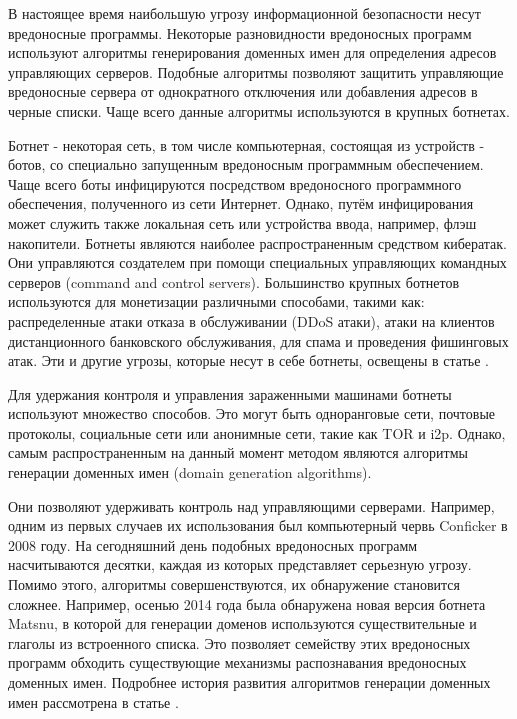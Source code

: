 
В настоящее время наибольшую угрозу информационной безопасности несут вредоносные программы. Некоторые разновидности вредоносных программ используют алгоритмы генерирования доменных имен для определения адресов управляющих серверов. Подобные алгоритмы позволяют защитить управляющие вредоносные сервера от однократного отключения или добавления адресов в черные списки. Чаще всего данные алгоритмы используются в крупных ботнетах.

Ботнет - некоторая сеть, в том числе компьютерная, состоящая из устройств - ботов, со специально запущенным вредоносным программным обеспечением. Чаще всего боты инфицируются посредством вредоносного программного обеспечения, полученного из сети Интернет. Однако, путём инфицирования может служить также локальная сеть или устройства ввода, например, флэш накопители. Ботнеты являются наиболее распространенным средством кибератак. Они управляются создателем при помощи специальных управляющих командных серверов (command and control servers). Большинство крупных ботнетов используются для монетизации различными способами, такими как: распределенные атаки отказа в обслуживании (DDoS атаки), атаки на клиентов дистанционного банковского обслуживания, для спама и проведения фишинговых атак. Эти и другие угрозы, которые несут в себе ботнеты, освещены в статье \cite{gonchar}.

Для удержания контроля и управления зараженными машинами ботнеты используют множество способов. Это могут быть одноранговые сети, почтовые протоколы, социальные сети или анонимные сети, такие как TOR и i2p.
Однако, самым распространенным на данный момент методом являются алгоритмы генерации доменных имен (domain generation algorithms).

Они позволяют удерживать контроль над управляющими серверами. Например, одним из первых случаев их использования был компьютерный червь Conficker в 2008 году. На сегодняшний день подобных вредоносных программ насчитываются десятки, каждая из которых представляет серьезную угрозу. Помимо этого, алгоритмы совершенствуются, их обнаружение становится сложнее. Например, осенью 2014 года была обнаружена новая версия ботнета Matsnu, в которой для генерации доменов используются существительные и глаголы из встроенного списка. Это позволяет семейству этих вредоносных программ обходить существующие механизмы распознавания вредоносных доменных имен. Подробнее история развития алгоритмов генерации доменных имен рассмотрена в статье \cite{Raff}.

